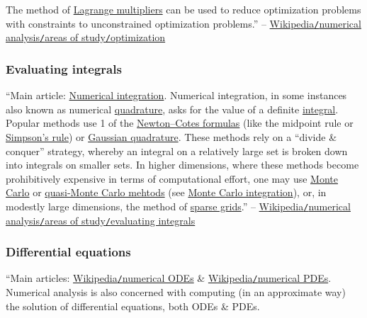 \documentclass[oneside]{book}
\numberwithin{equation}{section}
\begin{document}
The method of \href{https://en.wikipedia.org/wiki/Lagrange_multipliers}{Lagrange multipliers} can be used to reduce optimization problems with constraints to unconstrained optimization problems.'' -- \href{https://en.wikipedia.org/wiki/Numerical_analysis#Optimization}{Wikipedia\texttt{/}numerical analysis\texttt{/}areas of study\texttt{/}optimization}

\subsubsection{Evaluating integrals}
``Main article: \href{https://en.wikipedia.org/wiki/Numerical_integration}{Numerical integration}. Numerical integration, in some instances also known as numerical \href{https://en.wikipedia.org/wiki/Quadrature_(mathematics)}{quadrature}, asks for the value of a definite \href{https://en.wikipedia.org/wiki/Integral}{integral}. Popular methods use 1 of the \href{https://en.wikipedia.org/wiki/Newton%E2%80%93Cotes_formulas}{Newton--Cotes formulas} (like the midpoint rule or \href{https://en.wikipedia.org/wiki/Simpson%27s_rule}{Simpson's rule}) or \href{https://en.wikipedia.org/wiki/Gaussian_quadrature}{Gaussian quadrature}. These methods rely on a ``divide \& conquer'' strategy, whereby an integral on a relatively large set is broken down into integrals on smaller sets. In higher dimensions, where these methods become prohibitively expensive in terms of computational effort, one may use \href{https://en.wikipedia.org/wiki/Monte_Carlo_method}{Monte Carlo} or \href{https://en.wikipedia.org/wiki/Quasi-Monte_Carlo_method}{quasi-Monte Carlo mehtods} (see \href{https://en.wikipedia.org/wiki/Monte_Carlo_integration}{Monte Carlo integration}), or, in modestly large dimensions, the method of \href{https://en.wikipedia.org/wiki/Sparse_grid}{sparse grids}.'' -- \href{https://en.wikipedia.org/wiki/Numerical_analysis#Evaluating_integrals}{Wikipedia\texttt{/}numerical analysis\texttt{/}areas of study\texttt{/}evaluating integrals}

\subsubsection{Differential equations}
``Main articles: \href{https://en.wikipedia.org/wiki/Numerical_ordinary_differential_equations}{Wikipedia\texttt{/}numerical ODEs} \& \href{https://en.wikipedia.org/wiki/Numerical_partial_differential_equations}{Wikipedia\texttt{/}numerical PDEs}. Numerical analysis is also concerned with computing (in an approximate way) the solution of differential equations, both ODEs \& PDEs.
\end{document}
